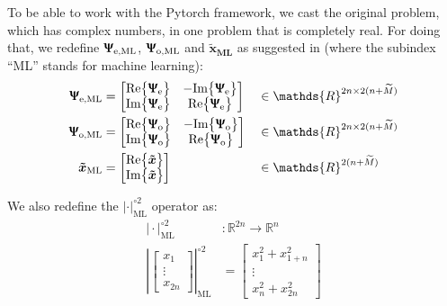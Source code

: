 To be able to work with the Pytorch framework, we cast the original problem, which has complex numbers, in one problem that is completely real. For doing  that, we redefine $\bm{\Uppsi_\text{e,ML}}$, $\bm{\Uppsi_\text{o,ML}}$ and $\bm{ \tilde{x}_\text{ML}}$ as suggested in \cite{Neev_2019} (where the subindex ``ML'' stands for machine learning):
\begin{align}
	\bm{\Uppsi_\text{e,ML}}& = \begin{bmatrix}
						\text{Re}\bigl\{ \bm{\Uppsi}_\text{e}\bigr\}&-\text{Im}\bigl\{ \bm{\Uppsi}_\text{e}\bigr\} \\
						\text{Im}\bigl\{ \bm{\Uppsi}_\text{e}\bigr\}&\text{Re}\bigl\{ \bm{\Uppsi}_\text{e}\bigr\} \\
					     \end{bmatrix}&& \in \mathds{R}^{2n\times2(n+\widetilde{M})}\\
	\bm{\Uppsi_\text{o,ML}}& = \begin{bmatrix}
						\text{Re}\bigl\{ \bm{\Uppsi}_\text{o}\bigr\}&-\text{Im}\bigl\{ \bm{\Uppsi}_\text{o}\bigr\} \\
						\text{Im}\bigl\{ \bm{\Uppsi}_\text{o}\bigr\}&\text{Re}\bigl\{ \bm{\Uppsi}_\text{o}\bigr\} \\
					     \end{bmatrix}&& \in \mathds{R}^{2n\times2(n+\widetilde{M})}\\
	\bm{\tilde{x}_\text{ML}}& = \begin{bmatrix}
					\text{Re}\bigl\{ \bm{\tilde{x}}\bigr\}\\
					\text{Im}\bigl\{ \bm{\tilde{x}}\bigr\}
				\end{bmatrix} &&\in \mathds{R}^{2(n+\widetilde{M})}\\
\end{align} 

We also redefine the $|\cdot|^{\circ2}_\text{ML}$ operator as:
\begin{align}
	\bigl|\cdot\bigr|^{\circ2}_\text{ML}&: \mathds{R}^{2n} \rightarrow \mathds{R}^n\\
	\left|\begin{bmatrix}
	x_1\\
	\vdots\\
	x_{2n}
	\end{bmatrix}\right|^{\circ2}_\text{ML}&=
	\begin{bmatrix}
	x_1^2+x_{1+n}^2\\
	\vdots\\
	x_n^2+x_{2n}^2
	\end{bmatrix}
\end{align}

